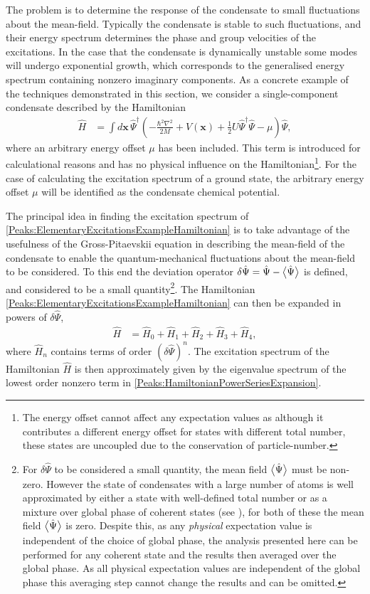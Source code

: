 The problem is to determine the response of the condensate to small fluctuations about the mean-field. Typically the condensate is stable to such fluctuations, and their energy spectrum determines the phase and group velocities of the excitations.  In the case that the condensate is dynamically unstable some modes will undergo exponential growth, which corresponds to the generalised energy spectrum containing nonzero imaginary components. As a concrete example of the techniques demonstrated in this section, we consider a single-component condensate described by the Hamiltonian
\begin{align}
    \label{Peaks:ElementaryExcitationsExampleHamiltonian}
    \hat{H} &= \int d \bm{x}\, \hat{\Psi}^\dagger \left( -\frac{\hbar^2 \nabla^2}{2 M} + V(\bm{x}) + \frac{1}{2} U \hat{\Psi}^\dagger \hat{\Psi} - \mu \right) \hat{\Psi},
\end{align}
where an arbitrary energy offset $\mu$ has been included. This term is introduced for calculational reasons and has no physical influence on the Hamiltonian\footnote{The energy offset cannot affect any expectation values as although it contributes a different energy offset for states with different total number, these states are uncoupled due to the conservation of particle-number.}. For the case of calculating the excitation spectrum of a ground state, the arbitrary energy offset $\mu$ will be identified as the condensate chemical potential.

The principal idea in finding the excitation spectrum of \eqref{Peaks:ElementaryExcitationsExampleHamiltonian} is to take advantage of the usefulness of the Gross-Pitaevskii equation in describing the mean-field of the condensate to enable the quantum-mechanical fluctuations about the mean-field to be considered. To this end the deviation operator $\delta \hat{\Psi} = \hat{\Psi} - {\big<\hat{\Psi}\big>}$ is defined, and considered to be a small quantity\footnote{For $\delta\hat{\Psi}$ to be considered a small quantity, the mean field ${\big<\hat{\Psi}\big>}$ must be non-zero. However the state of condensates with a large number of atoms is well approximated by either a state with well-defined total number or as a mixture over global phase of coherent states (see ), for both of these the mean field ${\big<\hat{\Psi}\big>}$ is zero. Despite this, as any \emph{physical} expectation value is independent of the choice of global phase, the analysis presented here can be performed for any coherent state and the results then averaged over the global phase. As all physical expectation values are independent of the global phase this averaging step cannot change the results and can be omitted.}. The Hamiltonian \eqref{Peaks:ElementaryExcitationsExampleHamiltonian} can then be expanded in powers of $\delta \hat{\Psi}$,
\begin{align}
    \label{Peaks:HamiltonianPowerSeriesExpansion}
    \hat{H} &= \hat{H}_0 + \hat{H}_1 + \hat{H}_2 + \hat{H}_3 + \hat{H}_4,
\end{align}
where $\hat{H}_n$ contains terms of order $(\delta\hat{\Psi})^n$. The excitation spectrum of the Hamiltonian $\hat{H}$ is then approximately given by the eigenvalue spectrum of the lowest order nonzero term in \eqref{Peaks:HamiltonianPowerSeriesExpansion}.

